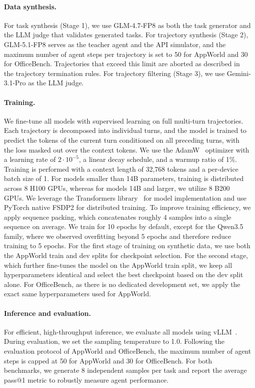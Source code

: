\paragraph{Data synthesis.}
For task synthesis (Stage 1), we use GLM-4.7-FP8 as both the task generator and the LLM judge that validates generated tasks. For trajectory synthesis (Stage 2), GLM-5.1-FP8 serves as the teacher agent and the API simulator, and the maximum number of agent steps per trajectory is set to 50 for AppWorld and 30 for OfficeBench. Trajectories that exceed this limit are aborted as described in the trajectory termination rules. For trajectory filtering (Stage 3), we use Gemini-3.1-Pro as the LLM judge.

\paragraph{Training.}
We fine-tune all models with supervised learning on full multi-turn trajectories. Each trajectory is decomposed into individual turns, and the model is trained to predict the tokens of the current turn conditioned on all preceding turns, with the loss masked out over the context tokens. We use the AdamW~\citep{adamw} optimizer with a learning rate of $2\cdot 10^{-5}$, a linear decay schedule, and a warmup ratio of 1\%. Training is performed with a context length of 32{,}768 tokens and a per-device batch size of 1. For models smaller than 14B parameters, training is distributed across 8 H100 GPUs, whereas for models 14B and larger, we utilize 8 B200 GPUs. We leverage the Transformers library~\citep{wolf-etal-2020-transformers} for model implementation and use PyTorch native FSDP2 for distributed training. To improve training efficiency, we apply sequence packing, which concatenates roughly 4 samples into a single sequence on average. We train for 10 epochs by default, except for the Qwen3.5 family, where we observed overfitting beyond 5 epochs and therefore reduce training to 5 epochs. For the first stage of training on synthetic data, we use both the AppWorld train and dev splits for checkpoint selection. For the second stage, which further fine-tunes the model on the AppWorld train split, we keep all hyperparameters identical and select the best checkpoint based on the dev split alone. For OfficeBench, as there is no dedicated development set, we apply the exact same hyperparameters used for AppWorld.

\paragraph{Inference and evaluation.}
For efficient, high-throughput inference, we evaluate all models using vLLM~\citep{kwon2023efficient}. During evaluation, we set the sampling temperature to 1.0. Following the evaluation protocol of AppWorld and OfficeBench, the maximum number of agent steps is capped at 50 for AppWorld and 30 for OfficeBench. For both benchmarks, we generate 8 independent samples per task and report the average pass@1 metric to robustly measure agent performance.





